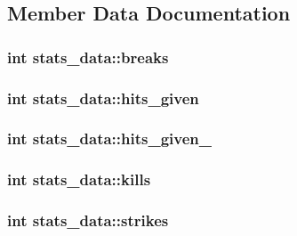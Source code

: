 \subsection{Member Data Documentation}
\hypertarget{structstats__data_a5d0d327b625586d49304613246db3c4e}{
\subsubsection[{breaks}]{\setlength{\rightskip}{0pt plus 5cm}int stats\-\_\-data\-::breaks}}\label{structstats__data_a5d0d327b625586d49304613246db3c4e}
\hypertarget{structstats__data_a63149070bb61d1c3301b6036d7438eba}{
\subsubsection[{hits\-\_\-given}]{\setlength{\rightskip}{0pt plus 5cm}int stats\-\_\-data\-::hits\-\_\-given}}\label{structstats__data_a63149070bb61d1c3301b6036d7438eba}
\hypertarget{structstats__data_ac25231cdd786a1a31342a629cb3aa460}{
\subsubsection[{hits\-\_\-given\-\_\-2}]{\setlength{\rightskip}{0pt plus 5cm}int stats\-\_\-data\-::hits\-\_\-given\-\_}}\label{structstats__data_ac25231cdd786a1a31342a629cb3aa460}
\hypertarget{structstats__data_ae7d08d0a27b0f33fb890d176d7695335}{
\subsubsection[{kills}]{\setlength{\rightskip}{0pt plus 5cm}int stats\-\_\-data\-::kills}}\label{structstats__data_ae7d08d0a27b0f33fb890d176d7695335}
\hypertarget{structstats__data_a33514667c573932f9f532a05c9e465b7}{
\subsubsection[{strikes}]{\setlength{\rightskip}{0pt plus 5cm}int stats\-\_\-data\-::strikes}}\label{structstats__data_a33514667c573932f9f532a05c9e465b7}
